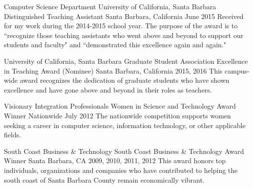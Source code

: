 \begin{cventries}


\cventry
{Computer Science Department \newline University of California, Santa Barbara}
    {Distinguished Teaching Assistant}
    {Santa Barbara, California}
    {June 2015}
    {
      Received for my work during the 2014-2015 school year. The purpose of the award is to ``recognize those teaching assistants who went above and beyond to support our students and faculty"​ and ``demonstrated this excellence again and again."
    }

\cventry
{University of California, Santa Barbara}
    {Graduate Student Association Excellence in Teaching Award (Nominee)}
    {Santa Barbara, California}
    {2015, 2016}
    {
      This campus-wide award recognizes the dedication of graduate students who have shown excellence and have gone above and beyond in their roles as teachers.
    }

\cventry
{Visionary Integration Professionals}
    {Women in Science and Technology Award Winner}
    {Nationwide}
    {July 2012}
    {
      The nationwide competition supports women seeking a career in computer science, information technology, or other applicable fields.
    }

\cventry
{South Coast Business \& Technology}
    {South Coast Business \& Technology Award Winner}
    {Santa Barbara, CA}
    {2009, 2010, 2011, 2012}
    {
      This award honors top individuals, organizations and companies who have contributed to helping the south coast of Santa Barbara County remain economically vibrant.
    }

%
%
%


\end{cventries}
